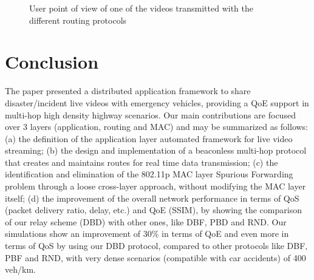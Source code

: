 \documentclass{sig-alternate-2013}
\begin{document}
\begin{figure}[!t]
\begin{center}
	\caption{User point of view of one of the videos transmitted with the different routing protocols}
	\label{fig:POV}
	\end{center}
\end{figure}




\section{Conclusion}
\label{conclusion}
The paper presented a distributed application framework to share disaster/incident live videos with emergency vehicles, providing a QoE support in multi-hop high density highway scenarios.
Our main contributions are focused over 3 layers (application, routing and MAC) and may be summarized as follows: (a) the definition of the application layer automated framework for live video streaming; (b) the design and implementation of a beaconless multi-hop protocol that creates and maintains routes for real time data transmission; (c) the identification and elimination of the 802.11p MAC layer Spurious Forwarding problem through a loose cross-layer approach, without modifying the MAC layer itself; (d) the improvement of the overall network performance in terms of QoS (packet delivery ratio, delay, etc.) and QoE (SSIM), by showing the comparison of our relay scheme (DBD) with other ones, like DBF, PBD and RND.
Our simulations show an improvement of 30\% in terms of QoE and even more in terms of QoS by using our DBD protocol, compared to other protocols like DBF, PBF and RND, with very dense scenarios (compatible with car accidents) of 400 veh/km.
\end{document}
